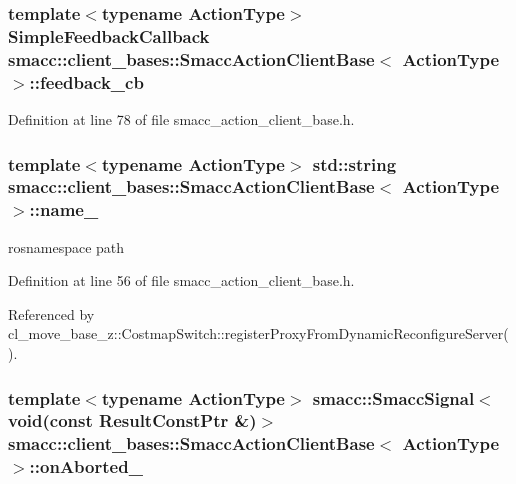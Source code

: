 \subsubsection[{\texorpdfstring{feedback\+\_\+cb}{feedback_cb}}]{\setlength{\rightskip}{0pt plus 5cm}template$<$typename Action\+Type$>$ {\bf Simple\+Feedback\+Callback} {\bf smacc\+::client\+\_\+bases\+::\+Smacc\+Action\+Client\+Base}$<$ Action\+Type $>$\+::feedback\+\_\+cb}\hypertarget{classsmacc_1_1client__bases_1_1SmaccActionClientBase_a978629b407530f1b7d266a009eff664b}{}\label{classsmacc_1_1client__bases_1_1SmaccActionClientBase_a978629b407530f1b7d266a009eff664b}


Definition at line 78 of file smacc\+\_\+action\+\_\+client\+\_\+base.\+h.

\subsubsection[{\texorpdfstring{name\+\_\+}{name_}}]{\setlength{\rightskip}{0pt plus 5cm}template$<$typename Action\+Type$>$ std\+::string {\bf smacc\+::client\+\_\+bases\+::\+Smacc\+Action\+Client\+Base}$<$ Action\+Type $>$\+::name\+\_\+}\hypertarget{classsmacc_1_1client__bases_1_1SmaccActionClientBase_a7f2e1834e915bdf7ae9db8b90b4597e6}{}\label{classsmacc_1_1client__bases_1_1SmaccActionClientBase_a7f2e1834e915bdf7ae9db8b90b4597e6}


rosnamespace path 



Definition at line 56 of file smacc\+\_\+action\+\_\+client\+\_\+base.\+h.



Referenced by cl\+\_\+move\+\_\+base\+\_\+z\+::\+Costmap\+Switch\+::register\+Proxy\+From\+Dynamic\+Reconfigure\+Server().

\subsubsection[{\texorpdfstring{on\+Aborted\+\_\+}{onAborted_}}]{\setlength{\rightskip}{0pt plus 5cm}template$<$typename Action\+Type$>$ {\bf smacc\+::\+Smacc\+Signal}$<$void(const Result\+Const\+Ptr \&)$>$ {\bf smacc\+::client\+\_\+bases\+::\+Smacc\+Action\+Client\+Base}$<$ Action\+Type $>$\+::on\+Aborted\+\_\+}\hypertarget{classsmacc_1_1client__bases_1_1SmaccActionClientBase_adc33748ca4fcef9730f8039b75d496d0}{}\label{classsmacc_1_1client__bases_1_1SmaccActionClientBase_adc33748ca4fcef9730f8039b75d496d0}


